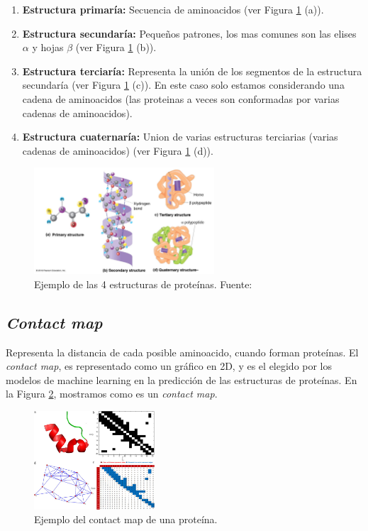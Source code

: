 \documentclass{article}
\begin{document}
	\begin{enumerate}
		\item \textbf{Estructura primaría:} Secuencia de aminoacidos (ver Figura \ref{fig:protein_structure} (a)).
		\item \textbf{Estructura secundaría:} Pequeños patrones, los mas comunes son las elises $\alpha$ y hojas $\beta$ (ver Figura \ref{fig:protein_structure} (b)).
		\item \textbf{Estructura terciaría:} Representa la unión de los segmentos de la estructura secundaría (ver Figura \ref{fig:protein_structure} (c)). En este caso solo estamos considerando una cadena de aminoacidos (las proteinas a veces son conformadas por varias cadenas de aminoacidos).
		\item \textbf{Estructura cuaternaría:} Union de varias estructuras terciarias (varias cadenas de aminoacidos) (ver Figura \ref{fig:protein_structure} (d)).
	\end{enumerate}
	
	
	\begin{figure}[H]
		\centering
		\includegraphics[width=0.6\textwidth]{img/papers/protein_structure}
		\caption{Ejemplo de las 4 estructuras de proteínas. Fuente: \citep{russell2002igenetics}}
		\label{fig:protein_structure}
	\end{figure}
	
	
	\subsection{\textit{Contact map}}
	
	Representa la distancia de cada posible aminoacido, cuando forman proteínas. El \textit{contact map}, es representado como un gráfico en 2D, y es el elegido por los modelos de machine learning en la predicción de las estructuras de proteínas. En la Figura \ref{fig:contact_map}, mostramos como es un \textit{contact map}.
	
	\begin{figure}[H]
		\centering
		\includegraphics[width=0.4\textwidth]{img/papers/contact_map}
		\caption{Ejemplo del contact map de una proteína.}
		\label{fig:contact_map}
	\end{figure}
	
\end{document}
